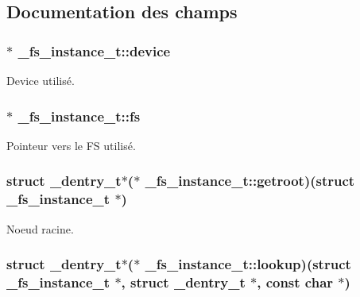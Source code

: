 \subsection{\-Documentation des champs}
\hypertarget{struct__fs__instance__t_acc3db122838752a84c6ecb93c3644256}{
\subsubsection[{device}]{$\ast$ {\bf \-\_\-fs\-\_\-instance\-\_\-t\-::device}}}\label{struct__fs__instance__t_acc3db122838752a84c6ecb93c3644256}
\-Device utilisé. \hypertarget{struct__fs__instance__t_a209ef4e2ed00460eead263311373a974}{
\subsubsection[{fs}]{$\ast$ {\bf \-\_\-fs\-\_\-instance\-\_\-t\-::fs}}}\label{struct__fs__instance__t_a209ef4e2ed00460eead263311373a974}
\-Pointeur vers le \-F\-S utilisé. \hypertarget{struct__fs__instance__t_af6891a9d9e5c2fd0458312fd8567213a}{
\subsubsection[{getroot}]{\setlength{\rightskip}{0pt plus 5cm}struct {\bf \-\_\-dentry\-\_\-t}$\ast$($\ast$ {\bf \-\_\-fs\-\_\-instance\-\_\-t\-::getroot})(struct {\bf \-\_\-fs\-\_\-instance\-\_\-t} $\ast$)}}\label{struct__fs__instance__t_af6891a9d9e5c2fd0458312fd8567213a}
\-Noeud racine. \hypertarget{struct__fs__instance__t_a820510562ecb31cbbf6b4fc8a4d2ce6a}{
\subsubsection[{lookup}]{\setlength{\rightskip}{0pt plus 5cm}struct {\bf \-\_\-dentry\-\_\-t}$\ast$($\ast$ {\bf \-\_\-fs\-\_\-instance\-\_\-t\-::lookup})(struct {\bf \-\_\-fs\-\_\-instance\-\_\-t} $\ast$, struct {\bf \-\_\-dentry\-\_\-t} $\ast$, const char $\ast$)}}\label{struct__fs__instance__t_a820510562ecb31cbbf6b4fc8a4d2ce6a}
